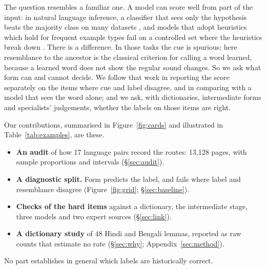 \documentclass[11pt]{article}
\begin{document}
The question resembles a familiar one. A model can score well from part of the input: in natural language inference, a classifier that sees only the hypothesis beats the majority class on many datasets \citep{poliak2018hypothesis,gururangan2018annotation}, and models that adopt heuristics which hold for frequent example types fail on a controlled set where the heuristics break down \citep{mccoy2019right}. There is a difference. In those tasks the cue is spurious; here resemblance to the ancestor is the classical criterion for calling a word learned, because a learned word does not show the regular sound changes. So we ask what form can and cannot decide. We follow that work in reporting the score separately on the items where cue and label disagree, and in comparing with a model that sees the word alone; and we ask, with dictionaries, intermediate forms and specialists' judgements, whether the labels on those items are right.

Our contributions, summarised in Figure~\ref{fig:cards} and illustrated in Table~\ref{tab:examples}, are these.
\begin{itemize}
\item \textbf{An audit} of how 17 language pairs record the routes: 13,128 pages, with sample proportions and intervals (\S\ref{sec:audit}).
\item \textbf{A diagnostic split.} Form predicts the label, and fails where label and resemblance disagree (Figure~\ref{fig:grid}; \S\ref{sec:baseline}).
\item \textbf{Checks of the hard items} against a dictionary, the intermediate stage, three models and two expert sources (\S\ref{sec:link}).
\item \textbf{A dictionary study} of 48 Hindi and Bengali lemmas, reported as raw counts that estimate no rate (\S\ref{sec:why}; Appendix~\ref{sec:method}).
\end{itemize}
No part establishes in general which labels are historically correct.
\end{document}
